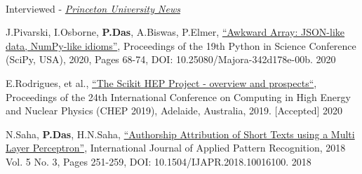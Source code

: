 \documentclass[10pt, letterpaper]{fulldeps}
\begin{document}
\vspace{-3pt}

%
%
\vspace{-4pt}
\\
\vspace{-15pt}
\begin{tightitemize}
\item Interviewed - \textit{\href{https://www.princeton.edu/news/2019/08/19/princeton-leads-efforts-develop-national-data-training-framework-high-energy}{Princeton University News}}
\end{tightitemize}
\vspace{-7pt}


%
%
\small{\begin{tightitemize}
    \item J.Pivarski, I.Osborne, {\textbf{P.Das}}, A.Biswas, P.Elmer, {\href{http://conference.scipy.org/proceedings/scipy2020/jim_pivarski.html}{``Awkward Array: JSON-like data, NumPy-like idioms''}}, Proceedings of the 19th Python in Science Conference (SciPy, USA), 2020, Pages 68-74, DOI: 10.25080/Majora-342d178e-00b. \hfill{2020}
    \item E.Rodrigues, et al., {\href{https://arxiv.org/abs/2007.03577}{``The Scikit HEP Project - overview and prospects``}}, Proceedings of the 24th International Conference on Computing in High Energy and Nuclear Physics (CHEP 2019), Adelaide, Australia, 2019. [Accepted] \hfill{2020}
    \item N.Saha, {\textbf{P.Das}}, H.N.Saha, {\href{https://www.inderscienceonline.com/doi/abs/10.1504/IJAPR.2018.094819}{``Authorship Attribution of Short Texts using a Multi Layer Perceptron''}}, International Journal of Applied Pattern Recognition, 2018 Vol. 5 No. 3, Pages 251-259, DOI: 10.1504/IJAPR.2018.10016100. \hfill{2018}
\end{tightitemize}}
\end{document}
